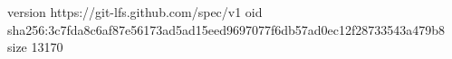 version https://git-lfs.github.com/spec/v1
oid sha256:3c7fda8c6af87e56173ad5ad15eed9697077f6db57ad0ec12f28733543a479b8
size 13170
